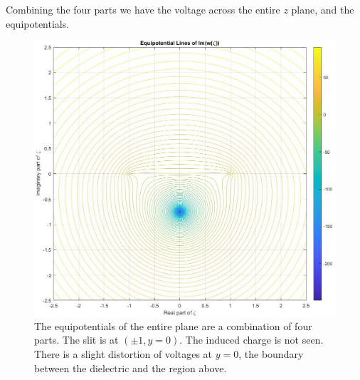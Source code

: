 Combining the four parts we have the voltage across the entire $z$ plane, and the equipotentials.
    \begin{figure}[H]
        \centering
        \includegraphics[width=1.\linewidth]{Figs/whole slit vot.jpg}
        \caption{\small The equipotentials of the entire plane are a combination of four parts. The slit is at $(\pm1,y=0)$. The induced charge is not seen. There is a slight distortion of voltages at $y=0$, the boundary between the dielectric and the region above.}
        \label{fig:enter-label}
    \end{figure}
 

